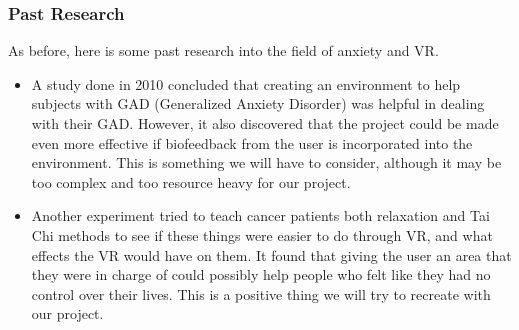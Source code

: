 \documentclass[a4paper,10pt]{article}
\begin{document}
\subsubsection{Past Research}
As before, here is some past research into the field of anxiety and VR.
\begin{itemize}
	\item A study done in 2010 concluded that creating an environment to help subjects with GAD (Generalized Anxiety Disorder) was helpful in dealing with their GAD.  However, it also discovered that the project could be made even more effective if biofeedback from the user is incorporated into the environment.  This is something we will have to consider, although it may be too complex and too resource heavy for our project. \cite{calmOne}
	\item Another experiment tried to teach cancer patients both relaxation and Tai Chi methods to see if these things were easier to do through VR, and what effects the VR would have on them.  It found that giving the user an area that they were in charge of could possibly help people who felt like they had no control over their lives. This is a positive thing we will try to recreate with our project.
\end{itemize}
\pagebreak
\end{document}
